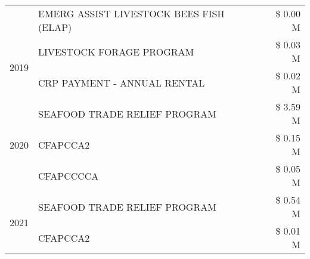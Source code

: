 \begin{tabular}{llr}
 & EMERG ASSIST LIVESTOCK BEES FISH (ELAP) & \$ 0.00 M \\
\cline{1-3}
\multirow[t]{2}{*}{2019} & LIVESTOCK FORAGE PROGRAM & \$ 0.03 M \\
 & CRP PAYMENT - ANNUAL RENTAL & \$ 0.02 M \\
\cline{1-3}
\multirow[t]{3}{*}{2020} & SEAFOOD TRADE RELIEF PROGRAM & \$ 3.59 M \\
 & CFAPCCA2 & \$ 0.15 M \\
 & CFAPCCCCA & \$ 0.05 M \\
\cline{1-3}
\multirow[t]{2}{*}{2021} & SEAFOOD TRADE RELIEF PROGRAM & \$ 0.54 M \\
 & CFAPCCA2 & \$ 0.01 M \\
\cline{1-3}
\bottomrule
\end{tabular}
